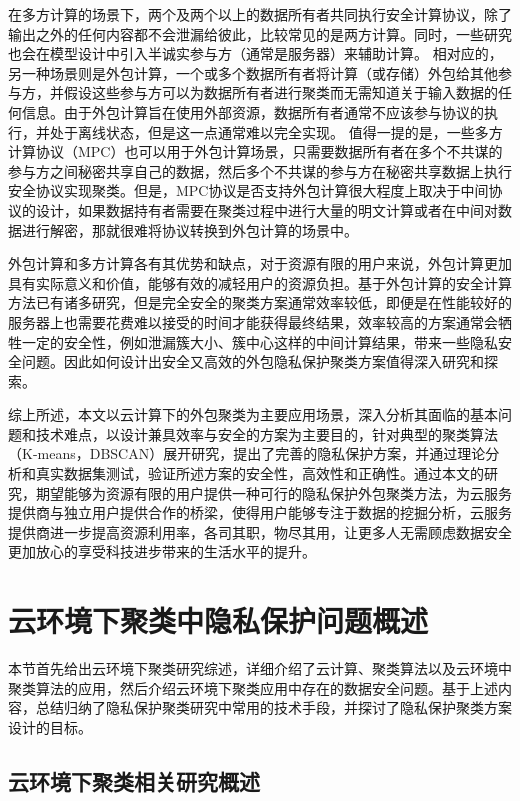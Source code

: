 在多方计算的场景下\cite{cramer2015secure}，两个及两个以上的数据所有者共同执行安全计算协议，除了输出之外的任何内容都不会泄漏给彼此，比较常见的是两方计算。同时，一些研究也会在模型设计中引入半诚实参与方（通常是服务器）来辅助计算。
相对应的，另一种场景则是外包计算\cite{li2018privacy}，一个或多个数据所有者将计算（或存储）外包给其他参与方，并假设这些参与方可以为数据所有者进行聚类而无需知道关于输入数据的任何信息。由于外包计算旨在使用外部资源，数据所有者通常不应该参与协议的执行，并处于离线状态，但是这一点通常难以完全实现。
值得一提的是，一些多方计算协议（MPC）也可以用于外包计算场景，只需要数据所有者在多个不共谋的参与方之间秘密共享自己的数据，然后多个不共谋的参与方在秘密共享数据上执行安全协议实现聚类。但是，MPC协议是否支持外包计算很大程度上取决于中间协议的设计，如果数据持有者需要在聚类过程中进行大量的明文计算或者在中间对数据进行解密，那就很难将协议转换到外包计算的场景中。

外包计算和多方计算各有其优势和缺点，对于资源有限的用户来说，外包计算更加具有实际意义和价值，能够有效的减轻用户的资源负担。基于外包计算的安全计算方法已有诸多研究，但是完全安全的聚类方案通常效率较低，即便是在性能较好的服务器上也需要花费难以接受的时间才能获得最终结果，效率较高的方案通常会牺牲一定的安全性，例如泄漏簇大小、簇中心这样的中间计算结果，带来一些隐私安全问题。因此如何设计出安全又高效的外包隐私保护聚类方案值得深入研究和探索。

综上所述，本文以云计算下的外包聚类为主要应用场景，深入分析其面临的基本问题和技术难点，以设计兼具效率与安全的方案为主要目的，针对典型的聚类算法（K-means，DBSCAN）展开研究，提出了完善的隐私保护方案，并通过理论分析和真实数据集测试，验证所述方案的安全性，高效性和正确性。通过本文的研究，期望能够为资源有限的用户提供一种可行的隐私保护外包聚类方法，为云服务提供商与独立用户提供合作的桥梁，使得用户能够专注于数据的挖掘分析，云服务提供商进一步提高资源利用率，各司其职，物尽其用，让更多人无需顾虑数据安全更加放心的享受科技进步带来的生活水平的提升。

\section{云环境下聚类中隐私保护问题概述}
本节首先给出云环境下聚类研究综述，详细介绍了云计算、聚类算法以及云环境中聚类算法的应用，然后介绍云环境下聚类应用中存在的数据安全问题。基于上述内容，总结归纳了隐私保护聚类研究中常用的技术手段，并探讨了隐私保护聚类方案设计的目标。
\subsection{云环境下聚类相关研究概述}
